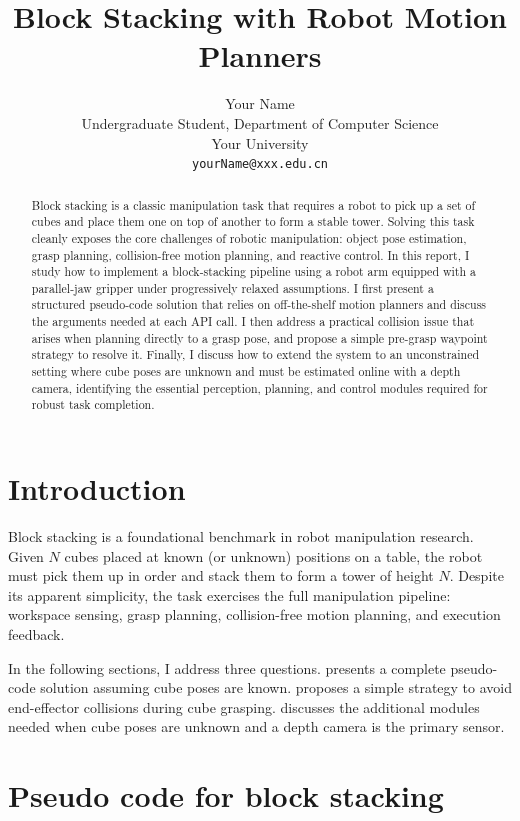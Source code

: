 \documentclass{article}
\title{Block Stacking with Robot Motion Planners}
\author{%
  Your Name \\
  Undergraduate Student, Department of Computer Science\\
  Your University\\
  \texttt{yourName@xxx.edu.cn} \\
}
\begin{document}
\maketitle

\begin{abstract}
Block stacking is a classic manipulation task that requires a robot to pick up a set of cubes and place them one on top of another to form a stable tower.
Solving this task cleanly exposes the core challenges of robotic manipulation: object pose estimation, grasp planning, collision-free motion planning, and reactive control.
In this report, I study how to implement a block-stacking pipeline using a robot arm equipped with a parallel-jaw gripper under progressively relaxed assumptions.
I first present a structured pseudo-code solution that relies on off-the-shelf motion planners and discuss the arguments needed at each API call.
I then address a practical collision issue that arises when planning directly to a grasp pose, and propose a simple pre-grasp waypoint strategy to resolve it.
Finally, I discuss how to extend the system to an unconstrained setting where cube poses are unknown and must be estimated online with a depth camera, identifying the essential perception, planning, and control modules required for robust task completion.
\end{abstract}


\section{Introduction}
\label{sec:introduction}

Block stacking is a foundational benchmark in robot manipulation research.
Given $N$ cubes placed at known (or unknown) positions on a table, the robot must pick them up in order and stack them to form a tower of height $N$.
Despite its apparent simplicity, the task exercises the full manipulation pipeline: workspace sensing, grasp planning, collision-free motion planning, and execution feedback.

In the following sections, I address three questions.
 presents a complete pseudo-code solution assuming cube poses are known.
 proposes a simple strategy to avoid end-effector collisions during cube grasping.
 discusses the additional modules needed when cube poses are unknown and a depth camera is the primary sensor.

\section{Pseudo code for block stacking}
\label{sec:pseudocode}
\end{document}
